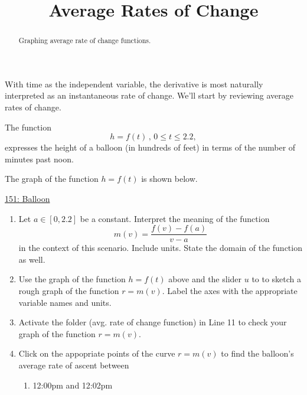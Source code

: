 \documentclass{ximera}
\title{Average Rates of Change}
\begin{document}
\begin{abstract}
Graphing average rate of change functions.
\end{abstract}
\maketitle


With time as the independent variable, the derivative is most naturally interpreted as an instantaneous rate of change. We'll start by reviewing average rates of change.

\begin{question}  \label{Q4ghg5t4t4tr4}
The function
\[
      h = f(t)  \, , \, 0\leq t \leq 2.2 ,                     %
\]
expresses the height of a balloon (in hundreds of feet) in terms of the number of minutes past noon.

The graph of the function $h=f(t)$ is shown below.

\begin{onlineOnly}
    \begin{center}
\end{center}
\end{onlineOnly}

\href{https://www.desmos.com/calculator/yd4xm6x6ub}{151: Balloon}

\begin{enumerate}

\item Let $a\in [0,2.2]$ be a constant. Interpret the meaning of the function
\[
   m(v) =  \frac{f(v)-f(a)}{v-a}
\]
in the context of this scenario. Include units. State the domain of the function as well.

\item Use the graph of the function $h=f(t)$ above and the slider $u$ to to sketch a rough graph of the function $r=m(v)$. Label the axes with the appropriate variable names and units.

\item Activate the folder (avg. rate of change function) in Line 11 to check your graph of the function $r=m(v)$. 

\item Click on the appopriate points of the curve $r=m(v)$ to find the balloon's average rate of ascent between 

\begin{enumerate}
\item 12:00pm and 12:02pm


\end{enumerate}
\end{enumerate}
\end{question}
\end{document}
